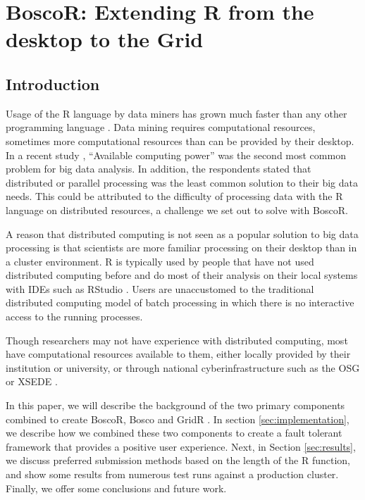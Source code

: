 \section{BoscoR: Extending R from the desktop to the Grid}

\subsection{Introduction}
Usage of the R language \cite{team2012r} by data miners has grown much faster than any other programming language \cite{rexer2013, KDnuggets2013}.  Data mining requires computational resources, sometimes more computational resources than can be provided by their desktop.  In a recent study \cite{rexer2013}, ``Available computing power'' was the second most common problem for big data analysis.  In addition, the respondents stated that distributed or parallel processing was the least common solution to their big data needs.  This could be attributed to the difficulty of processing data with the R language on distributed resources, a challenge we set out to solve with BoscoR.

A reason that distributed computing is not seen as a popular solution to big data processing is that scientists are more familiar processing on their desktop than in a cluster environment.  R is typically used by people that have not used distributed computing before and do most of their analysis on their local systems with IDEs such as RStudio \cite{racine2012rstudio}.  Users are unaccustomed to the traditional distributed computing model of batch processing in which there is no interactive access to the running processes.

Though researchers may not have experience with distributed computing, most have computational resources available to them, either locally provided by their institution or university, or through national cyberinfrastructure such as the OSG \cite{pordes2007open} or XSEDE \cite{xsede}.



In this paper, we will describe the background of the two primary components combined to create BoscoR, Bosco  \cite{weitzel2014accessing} and GridR  \cite{wegener2007gridr}.  In section \ref{sec:implementation}, we describe how we combined these two components to create a fault tolerant framework that provides a positive user experience.  Next, in Section \ref{sec:results}, we discuss preferred submission methods based on the length of the R function, and show some results from numerous test runs against a production cluster.  Finally, we offer some conclusions and future work.

